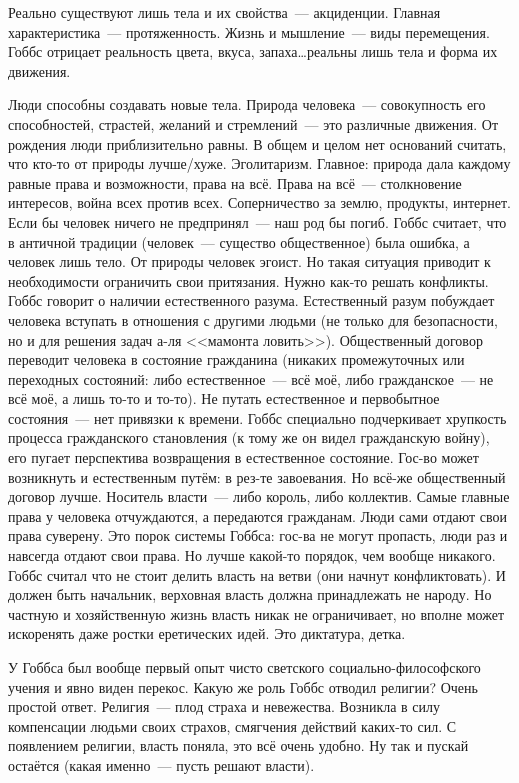 Реально существуют лишь тела и их свойства~--- акциденции. Главная характеристика~--- протяженность. Жизнь и мышление~--- виды перемещения. Гоббс отрицает реальность цвета, вкуса, запаха\ldots реальны лишь тела и форма их движения.

Люди способны создавать новые тела. Природа человека~--- совокупность его способностей, страстей, желаний и стремлений~--- это различные движения. От рождения люди приблизительно равны. В общем и целом нет оснований считать, что кто-то от природы лучше/хуже. Эголитаризм. Главное: природа дала каждому равные права и возможности, права на всё. Права на всё~--- столкновение интересов, война всех против всех. Соперничество за землю, продукты, интернет. Если бы человек ничего не предпринял~--- наш род бы погиб. Гоббс считает, что в античной традиции (человек~--- существо общественное) была ошибка, а человек лишь тело. От природы человек эгоист. Но такая ситуация приводит к необходимости ограничить свои притязания. Нужно как-то решать конфликты. Гоббс говорит о наличии естественного разума. Естественный разум побуждает человека вступать в отношения с другими людьми (не только для безопасности, но и для решения задач а-ля <<мамонта ловить>>). Общественный договор переводит человека в состояние гражданина (никаких промежуточных или переходных состояний: либо естественное~--- всё моё, либо гражданское~--- не всё моё, а лишь то-то и то-то). Не путать естественное и первобытное состояния~--- нет привязки к времени. Гоббс специально подчеркивает хрупкость процесса гражданского становления (к тому же он видел гражданскую войну), его пугает перспектива возвращения в естественное состояние. Гос-во может возникнуть и естественным путём: в рез-те завоевания. Но всё-же общественный договор лучше. Носитель власти~--- либо король, либо коллектив. Самые главные права у человека отчуждаются, а передаются гражданам. Люди сами отдают свои права суверену. Это порок системы Гоббса: гос-ва не могут пропасть, люди раз и навсегда отдают свои права. Но лучше какой-то порядок, чем вообще никакого. Гоббс считал что не стоит делить власть на ветви (они начнут конфликтовать). И должен быть начальник, верховная власть должна принадлежать не народу. Но частную и хозяйственную жизнь власть никак не ограничивает, но вполне может искоренять даже ростки еретических идей. Это диктатура, детка.

У Гоббса был вообще первый опыт чисто светского социально-философского учения и явно виден перекос. Какую же роль Гоббс отводил религии? Очень простой ответ. Религия~--- плод страха и невежества. Возникла в силу компенсации людьми своих страхов, смягчения действий каких-то сил. С появлением религии, власть поняла, это всё очень удобно. Ну так и пускай остаётся (какая именно~--- пусть решают власти). 

